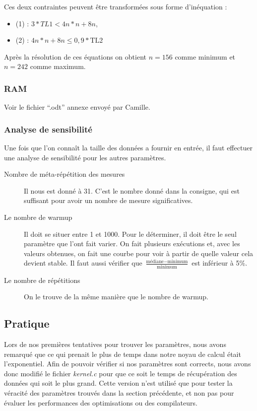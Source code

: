\documentclass[12pt,a4paper]{article}
\begin{document}
Ces deux contraintes peuvent être transformées sous forme d'inéquation :
\begin{itemize}
    \item (1) : $3*TL1 < 4n*n + 8n$,
    \item (2) : $4n*n + 8n \le 0,9*\text{TL2}$
\end{itemize}
Après la résolution de ces équations on obtient $n=156$ comme minimum et $n=242$
comme maximum.

\subsubsection{RAM}

Voir le fichier \enquote{.odt} annexe envoyé par Camille.

\subsubsection{Analyse de sensibilité}

Une fois que l'on connaît la taille des données a fournir en entrée, 
il faut effectuer une analyse de sensibilité pour les autres paramètres. 
\begin{description}
    \item[Nombre de méta-répétition des mesures] Il nous est donné à 31. C'est
        le nombre donné dans la consigne, qui est suffisant pour avoir un nombre
        de mesure significatives.
    \item[Le nombre de warmup] Il doit se situer entre 1 et 1000. Pour le
        déterminer, il doit être le seul paramètre que l'ont fait varier. On
        fait plusieurs exécutions et, avec les valeurs obtenues, on fait une
        courbe pour voir à partir de quelle valeur cela devient stable. Il faut
        aussi vérifier que
        $\frac{\text{médiane}-\text{minimum}}{\text{minimum}}$ est inférieur à
        5\%. 
    \item[Le nombre de répétitions] On le trouve de la même manière que le
        nombre de warmup.
\end{description}

\subsection{Pratique}

Lors de nos premières tentatives pour trouver les paramètres, nous avons remarqué
que ce qui prenait le plus de temps dans notre noyau de calcul était
l'exponentiel. Afin de pouvoir vérifier si nos paramètres sont corrects, nous
avons donc modifié le fichier \textit{kernel.c} pour que ce soit le temps de
récupération des données qui soit le plus grand. Cette version n'est utilisé que
pour tester la véracité des paramètres trouvés dans la section précédente, et
non pas pour évaluer les performances des optimisations ou des compilateurs.
\end{document}
